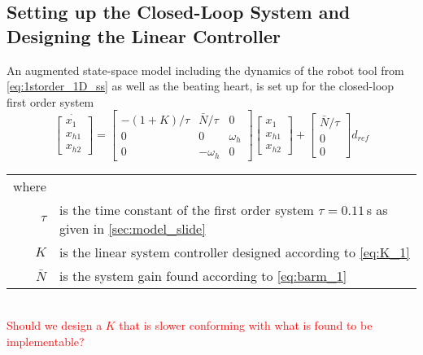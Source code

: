 \subsection{Setting up the Closed-Loop System and Designing the Linear Controller}
An augmented state-space model including the dynamics of the robot tool from \autoref{eq:1storder_1D_ss} as well as the beating heart, is set up for the closed-loop first order system
\begin{equation}
\dot{\begin{bmatrix}
	x_1\\x_{h1}\\x_{h2}
	\end{bmatrix}} =
\begin{bmatrix}
-(1+K)/\tau & \bar{N}/\tau & 0\\0 & 0 & \omega_h \\ 0 & -\omega_h & 0
\end{bmatrix}
\begin{bmatrix}
x_1\\x_{h1}\\x_{h2}
\end{bmatrix}+ 
\begin{bmatrix}
\bar{N}/\tau \\ 0 \\ 0
\end{bmatrix}
d_{ref}
\end{equation}
\begin{tabular}{rl}
where &\\
$\tau$ & is the time constant of the first order system $\tau=0.11$\,s as given in \autoref{sec:model_slide}\\
$K$ & is the linear system controller designed according to \autoref{eq:K_1}\\
$\bar{N}$ & is the system gain found according to \autoref{eq:barm_1}
\end{tabular}\\

\textcolor{red}{Should we design a $K$ that is slower conforming with what is found to be implementable?}


